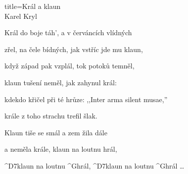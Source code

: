 \begin{song}{title=\centering Král a klaun \\\normalsize Karel Kryl  \vspace*{-0.3cm}}
{\sloka
	Král do boje táh', a v červáncích vlídných

	zřel, na čele bídných, jak vstříc jde mu klaun,

	když západ pak vzplál, tok potoků temněl,

	klaun tušení neměl, jak zahynul král:

	kdekdo křičel při té hrůze: ,,Inter arma silent musae,''

	krále z toho strachu trefil šlak.

	Klaun tiše se smál a zem žila dále
	
	a neměla krále, klaun na loutnu hrál,

	^{D7}klaun na loutnu ^{G}hrál, ^{D7}klaun na loutnu ^{G}hrál \ldots




}
\setcounter{Slokočet}{0}
\end{song}
